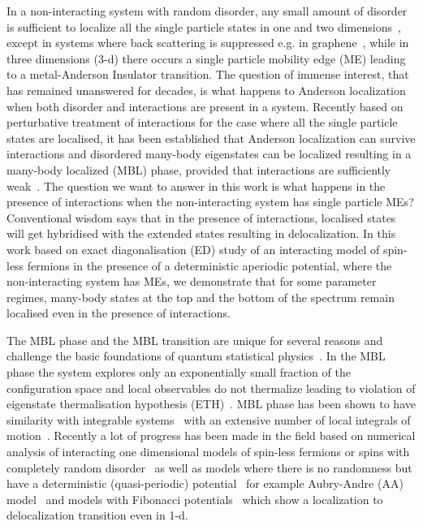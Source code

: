 \documentclass[prl,aps,twocolumn,floats,nofootinbib,showpacs]{revtex4}
\begin{document}
In a non-interacting system with random disorder, any small amount of disorder is sufficient to localize all the single particle states in one and two dimensions~\cite{Anderson,scaling,scaling_rmp}, except in systems where back scattering is suppressed e.g. in graphene~\cite{sdsarma_graphene,agarg}, while in three dimensions (3-d) there occurs a single particle mobility edge (ME) leading to a metal-Anderson Insulator transition. The question of immense interest, that has remained unanswered for decades, is what happens to Anderson localization when both disorder and interactions are present in a system. Recently based on perturbative treatment of interactions for the case where all the single particle states are localised, it has been established that Anderson localization can survive interactions and disordered many-body eigenstates can be localized resulting in a many-body localized (MBL) phase, provided that interactions are sufficiently weak~\cite{Basko}.
The question we want to answer in this work is what happens in the presence of interactions when the non-interacting system has single particle MEs? Conventional wisdom says that in the presence of interactions, localised states will get hybridised with the extended states resulting in delocalization. In this work based on exact diagonalisation (ED) study of an interacting model of spin-less fermions in the presence of a deterministic aperiodic potential, where the non-interacting system has MEs, we demonstrate that for some parameter regimes, many-body states at the top and the bottom of the spectrum remain localised even in the presence of interactions. 

 The MBL phase and the MBL transition are unique for several reasons and challenge the basic foundations of quantum statistical physics~\cite{Huse,Altman}.  In the MBL phase the system explores only an exponentially small fraction of the configuration space and local observables do not thermalize leading to violation of eigenstate thermalisation hypothesis (ETH)~\cite{Deutsch,Srednicki,Rigol}. MBL phase has been shown to have similarity with integrable systems~\cite{Huse2014,shastry} with an extensive number of local integrals of motion~\cite{Abanin,Mueller}. Recently a lot of progress has been made in the field based on numerical analysis of interacting one dimensional models of spin-less fermions or spins with completely random disorder~\cite{Bardarson2014,Bardarson2015,Alet,Sirker,Mueller2016} as well as models where there is no randomness but have a deterministic (quasi-periodic) potential~\cite{Huse2007,Huse2010,Huse2013,Subroto,Sdsarma,Pal1,Pal2,ME1} for example Aubry-Andre (AA) model~\cite{AA} and models with Fibonacci potentials~\cite{Giamarchi} which show a localization to delocalization transition even in 1-d. 
\end{document}
